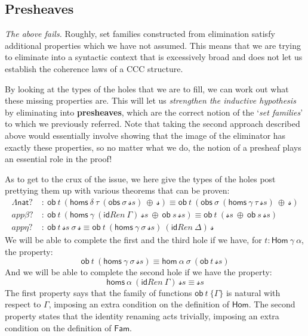 \subsection{Presheaves}

\emph{The above fails.} Roughly, set families constructed from elimination
satisfy additional properties which we have not assumed. This means that
we are trying to eliminate into a syntactic context that is excessively broad
and does not let us establish the coherence laws of a CCC structure.

By looking at the types of the holes that we are to fill, we can work out
what these missing properties are. This will let us \emph{strengthen the
inductive hypothesis} by eliminating into \textbf{presheaves}, which are the
correct notion of the `\emph{set families}' to which we previously referred.
Note that taking the second approach described above would essentially involve
showing that the image of the eliminator has exactly these properties, so
no matter what we do, the notion of a presheaf plays an essential role in
the proof!

As to get to the crux of the issue, we here give the types of the holes post
prettying them up with various theorems that can be proven:
\begin{align*}
\Lambda\mathsf{nat}?~&:~\mathsf{ob}~t~(\mathsf{homs}~\delta~\tau~(\mathsf{obs}
~\sigma~\mathcal{s}s)~\oplus~\mathcal{s}) \equiv \mathsf{ob}~t~(\mathsf{obs}
~\sigma~(\mathsf{homs}~\gamma~\tau~\mathcal{s}s)~\oplus~\mathcal{s})\\
\mathit{app}\beta?~&:~\mathsf{ob}~t~(\mathsf{homs}~\gamma~(\mathsf{id}
\mathit{Ren}~\Gamma)~\mathcal{s}s~\oplus~\mathsf{ob}~s ~\mathcal{s}s) \equiv
\mathsf{ob}~t~(\mathcal{s}s~\oplus~\mathsf{ob}~s~\mathcal{s}s) \\
\mathit{app}\eta?~&:~\mathsf{ob}~t~\mathcal{s}s~\sigma~\mathcal{s} \equiv
\mathsf{ob}~t~(\mathsf{homs}~\gamma~\sigma~\mathcal{s}s)~(\mathsf{id}
\mathit{Ren}~\Delta)~\mathcal{s}
\end{align*}
We will be able to complete the first and the third hole if we have, for $t :
\mathsf{Hom}~\gamma~\alpha$, the property:
\[\mathsf{ob}~t~(\mathsf{homs}~\gamma~\sigma~\mathcal{s}s) \equiv
\mathsf{hom}~\alpha~\sigma~(\mathsf{ob}~t~\mathcal{s}s)\]
And we will be able to complete the second hole if we have the property:
\[\mathsf{homs}~\alpha~(\mathsf{id}\mathit{Ren}~\Gamma)~\mathcal{s}s \equiv
\mathcal{s}s\]
The first property says that the family of functions $\mathsf{ob}~t~\{\Gamma\}$
is natural with respect to $\Gamma$, imposing an extra condition on the
definition of $\mathsf{Hom}$. The second property states that the identity
renaming acts trivially, imposing an extra condition on the definition of
$\mathsf{Fam}$.


